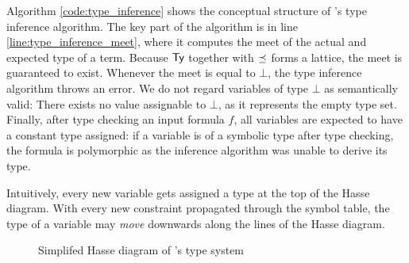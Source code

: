Algorithm \ref{code:type_inference} shows the conceptual structure of \MonPoly's type inference algorithm. The key part of the algorithm is in line \ref{line:type_inference_meet}, where it computes the meet of the actual and expected type of a term. Because $\mathsf{Ty}$ together with $\preceq$ forms a lattice, the meet is guaranteed to exist. Whenever the meet is equal to $\bot$, the type inference algorithm throws an error. We do not regard variables of type $\bot$ as semantically valid: There exists no value assignable to $\bot$, as it represents the empty type set. Finally, after type checking an input formula $f$, all variables are expected to have a constant type assigned: if a variable is of a symbolic type after type checking, the formula is polymorphic as the inference algorithm was unable to derive its type.

Intuitively, every new variable gets assigned a type at the top of the Hasse diagram. With every new constraint propagated through the symbol table, the type of a variable may \textit{move} downwards along the lines of the Hasse diagram.

\begin{figure}
	\centering
	\label{fig:type_lattice}
	\caption{Simplifed Hasse diagram of \MonPoly's type system}
\end{figure}

